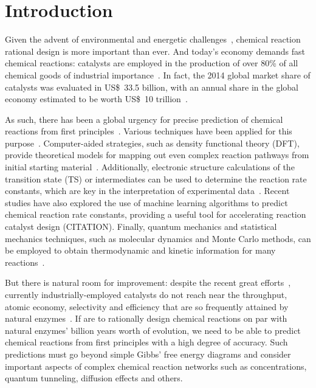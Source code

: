 \chapter{Introduction}%
\label{ch:introduction}


Given the advent of environmental and energetic challenges~\cite{Bertozzi_2016},
chemical reaction rational design is more important than ever.
And today's economy demands fast chemical reactions:
catalysts are employed in the production of over 80\% of all chemical
goods of industrial
importance~\cite{Breakthrough_Catalyst,GlobalCatalystMarket}.
In fact, the 2014 global market share of catalysts was evaluated in US\$~33.5 billion,
with an annual share in the global economy estimated to be worth US\$~10
trillion~\cite{GlobalCatalystMarket}.

As such, there has been a global urgency for precise prediction of chemical reactions from first principles~\cite{Kitchin_2012}.
Various techniques have been applied for this purpose~\cite{Houk_2014,Chin_2022,Cao2022}.
Computer-aided strategies, such as density functional theory (DFT),
provide theoretical models for mapping out even complex reaction pathways from initial starting material~\cite{Maeda_2011,Simm_2017,Rappoport_2019}.
Additionally, electronic structure calculations of the transition state (TS) or intermediates can be used to determine the reaction rate constants,
which are key in the interpretation of experimental data~\cite{Plata_2015,Santoro_2016,Coelho_2019,Oliveira_2020}.
Recent studies have also explored the use of machine learning algorithms
to predict chemical reaction rate constants, providing a useful tool for
accelerating reaction catalyst design (CITATION).
Finally, quantum mechanics and statistical mechanics techniques,
such as molecular dynamics and Monte Carlo methods,
can be employed to obtain thermodynamic and kinetic information for many reactions~\cite{Wang_2014}.

But there is natural room for improvement:
despite the recent great efforts~\cite{Peng_2016}, currently industrially-employed catalysts do
not reach near the throughput, atomic economy, selectivity and efficiency that
are so frequently attained by natural
enzymes~\cite{Catalysis_in_Chemistry_and_Enzymology}.
If are to rationally design chemical reactions on par with natural enzymes' billion years worth of evolution,
we need to be able to predict chemical reactions from first principles with a
high degree of accuracy.
Such predictions must go beyond simple Gibbs' free energy
diagrams and consider important aspects of complex chemical reaction networks
such as concentrations, quantum tunneling, diffusion effects and others.


